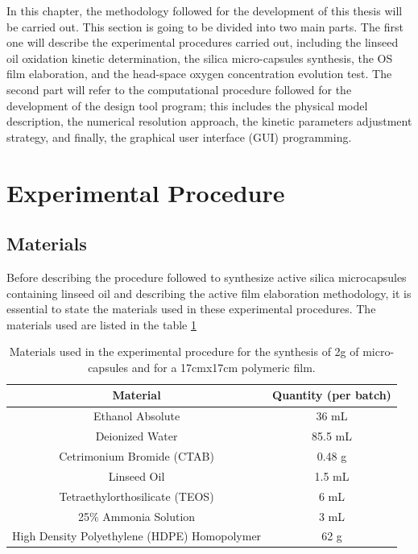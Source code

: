 \begin{refsection}
In this chapter, the methodology followed for the development of this thesis will be carried out. This section is going to be divided into two main parts. The first one will describe the experimental procedures carried out, including the linseed oil oxidation kinetic determination, the silica micro-capsules synthesis, the OS film elaboration, and the head-space oxygen concentration evolution test. The second part will refer to the computational procedure followed for the development of the design tool program; this includes the physical model description, the numerical resolution approach, the kinetic parameters adjustment strategy, and finally, the graphical user interface (GUI) programming. 

\section[Exp.Procedure]{Experimental Procedure}
\subsection{Materials}\label{subsec:materials}
Before describing the procedure followed to synthesize active silica microcapsules containing linseed oil and describing the active film elaboration methodology, it is essential to state the materials used in these experimental procedures. The materials used are listed in the table \ref{tab:material}

\begin{table}[h]
\centering
\caption{Materials used in the experimental procedure for the synthesis of 2g of micro-capsules and for a 17cmx17cm polymeric film.}
\label{tab:material}
\begin{tabular}{|c|c|}
\hline
Material                        & Quantity (per batch) \\ \hline
Ethanol  Absolute               & 36 mL                \\ \hline
Deionized  Water                & 85.5 mL              \\ \hline
Cetrimonium  Bromide (CTAB)     & 0.48 g               \\ \hline
Linseed  Oil                    & 1.5 mL               \\ \hline
Tetraethylorthosilicate  (TEOS) & 6 mL                 \\ \hline
25\% Ammonia Solution           & 3 mL                 \\ \hline
High Density Polyethylene (HDPE) Homopolymer & 62 g            \\ \hline
\end{tabular}
\end{table}


\end{refsection}
